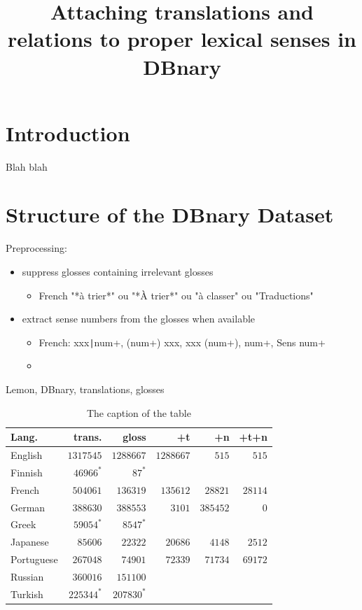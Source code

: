 \documentclass[10pt, a4paper]{article}
\title{Attaching translations and relations to proper lexical senses in DBnary}
\begin{document}
\maketitleabstract

\section{Introduction}
Blah blah

\section{Structure of the DBnary Dataset}

Preprocessing:

\begin{itemize}
   \item suppress glosses containing irrelevant glosses
   \begin{itemize}
      \item French "*à trier*" ou "*À trier*" ou "à classer" ou "Traductions"
   \end{itemize}
   \item extract sense numbers from the glosses when available
   \begin{itemize}
      \item French: xxx\texttt{|}num+, (num+) xxx, xxx (num+), num+, Sens num+
      \item 
   \end{itemize}
\end{itemize}
Lemon, DBnary, translations, glosses

\begin{table}[h]
\begin{center}\begin{footnotesize}
\begin{tabular}{lrrrrr}
\textbf{Lang.} & \textbf{trans.} & \textbf{gloss} & \textbf{+t} &  \textbf{+n} & \textbf{+t+n}\\
\hline
English & $1317545$ & $1288667$ & $1288667$ & $515$ & $515$ \\
Finnish & $46966^*$ & $87^*$ \\
French & $504061$ & $136319$ & $135612$ & $28821$ & $28114$ \\
German & $388630$ & $388553$ & $3101$ & $385452$ & $0$ \\
Greek & $59054^*$ & $8547^*$ \\
Japanese & $85606$ & $22322$ & $20686$ & $4148$ & $2512$ \\
Portuguese & $267048$ & $74901$ & $72339$ & $71734$ & $69172$ \\
Russian & $360016$ & $151100$ \\
Turkish & $225344^*$ & $207830^*$\\
\hline
\end{tabular}
\caption{The caption of the table}
\end{footnotesize}\end{center}
\end{table}
\end{document}
